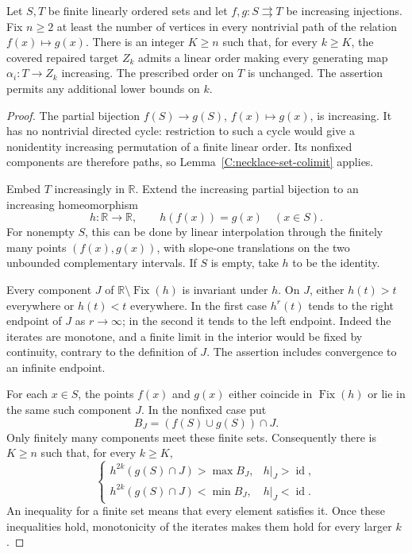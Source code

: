 \begin{proposition}
\label{C:ordered-necklace}
Let $S,T$ be finite linearly ordered sets and let
$f,g:S\rightrightarrows T$ be increasing injections. Fix $n\geq2$
at least the number of vertices in every nontrivial path of the relation
$f(x)\mapsto g(x)$. There is an integer $K\geq n$ such that, for every
$k\geq K$, the covered repaired target $Z_k$ admits a linear order
making every generating map $\alpha_i:T\to Z_k$ increasing.
The prescribed order on $T$ is unchanged. The assertion permits any
additional lower bounds on $k$.
\end{proposition}
\begin{proof}
The partial bijection $f(S)\to g(S)$, $f(x)\mapsto g(x)$, is
increasing. It has no nontrivial directed cycle: restriction to such
a cycle would give a nonidentity increasing permutation of a finite
linear order. Its nonfixed components are therefore paths, so
Lemma~\ref{C:necklace-set-colimit} applies.

Embed $T$ increasingly in $\mathbb R$. Extend the increasing partial
bijection to an increasing homeomorphism
\[
 h:\mathbb R\longrightarrow\mathbb R,
 \qquad h(f(x))=g(x)\quad(x\in S).
 \tag{H}\label{eq:akr-order-h}
\]
For nonempty $S$, this can be done by linear interpolation through
the finitely many points $(f(x),g(x))$, with slope-one translations
on the two unbounded complementary intervals. If $S$ is empty, take
$h$ to be the identity.

Every component $J$ of $\mathbb R\setminus\operatorname{Fix}(h)$
is invariant under $h$. On $J$, either $h(t)>t$ everywhere or
$h(t)<t$ everywhere. In the first case $h^r(t)$ tends to the right
endpoint of $J$ as $r\to\infty$; in the second it tends to the left
endpoint. Indeed the iterates are monotone, and a finite limit in the
interior would be fixed by continuity, contrary to the definition of
$J$. The assertion includes convergence to an infinite endpoint.

For each $x\in S$, the points $f(x)$ and $g(x)$ either coincide in
$\operatorname{Fix}(h)$ or lie in the same such component $J$.
In the nonfixed case put
\[
 B_J=(f(S)\cup g(S))\cap J.
\]
Only finitely many components meet these finite sets. Consequently
there is $K\geq n$ such that, for every $k\geq K$,
\[
 \begin{cases}
 h^{2k}(g(S)\cap J)>\max B_J,&h|_J>\operatorname{id},\\
 h^{2k}(g(S)\cap J)<\min B_J,&h|_J<\operatorname{id}.
 \end{cases}
 \tag{S}\label{eq:akr-order-separation}
\]
An inequality for a finite set means that every element satisfies it.
Once these inequalities hold, monotonicity of the iterates makes them
hold for every larger $k$.


\end{proof}
